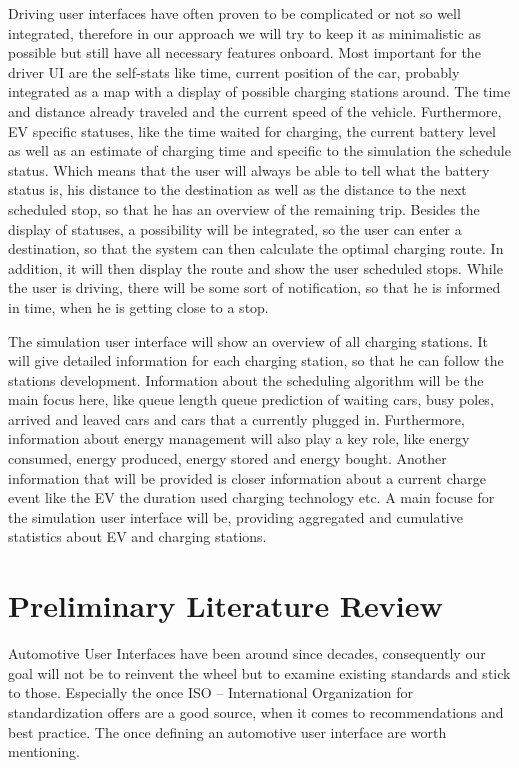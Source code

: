\documentclass[hidelinks]{sig-alternate}
\begin{document}
Driving user interfaces have often proven to be complicated or not so well integrated, therefore in our approach we
will try to keep it as minimalistic as possible but still have all necessary features onboard. Most important for the
driver UI are the self-stats like time, current position of the car, probably integrated as a map with a display of
possible charging stations around. The time and distance already traveled and the current speed of the vehicle.
Furthermore, EV specific statuses, like the time waited for charging, the current battery level as well as an
estimate of charging time and specific to the simulation the schedule status. Which means that the user will always
be able to tell what the battery status is, his distance to the destination as well as the distance to the next
scheduled stop, so that he has an overview of the remaining trip. Besides the display of statuses, a possibility
will be integrated, so the user can enter a destination, so that the system can then calculate the optimal charging
route. In addition, it will then display the route and show the user scheduled stops. While the user is driving,
there will be some sort of notification, so that he is informed in time, when he is getting close to a stop.

The simulation user interface will show an overview of all charging stations. It will give detailed information for
each charging station, so that he can follow the stations development. Information about the scheduling algorithm
will be the main focus here, like queue length queue prediction of waiting cars, busy poles, arrived and leaved cars
and cars that a currently plugged in. Furthermore, information about energy management will also play a key role,
like energy consumed, energy produced, energy stored and energy bought. Another information that will be provided is
closer information about a current charge event like the EV the duration used charging technology etc. A main focuse
for the simulation user interface will be, providing aggregated and cumulative statistics about EV and charging
stations.

\section{Preliminary Literature Review}
Automotive User Interfaces have been around since decades, consequently our goal will not be to reinvent the wheel but to examine existing standards and stick to those. Especially the once ISO – International Organization for standardization offers are a good source, when it comes to recommendations and best practice. The once defining an automotive user interface are worth mentioning. 
\end{document}
